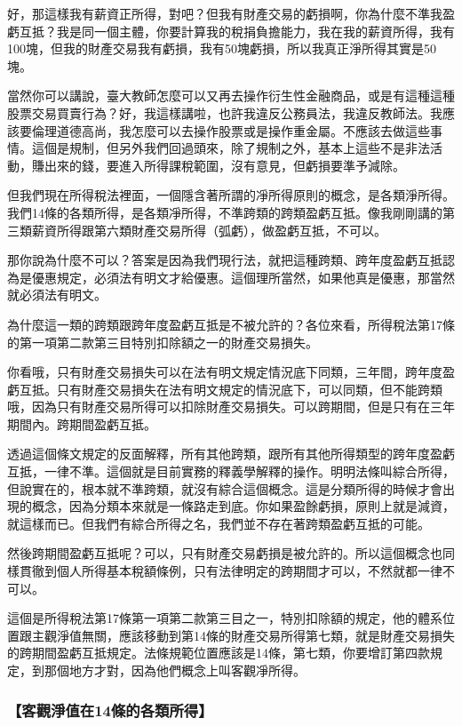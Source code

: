 \documentclass[oneside,sub3section]{ctexbook}
\begin{document}
好，那這樣我有薪資正所得，對吧？但我有財產交易的虧損啊，你為什麼不準我盈虧互抵？我是同一個主體，你要計算我的稅捐負擔能力，我在我的薪資所得，我有100塊，但我的財產交易我有虧損，我有50塊虧損，所以我真正淨所得其實是50塊。

當然你可以講說，臺大教師怎麼可以又再去操作衍生性金融商品，或是有這種這種股票交易買賣行為？好，我這樣講啦，也許我違反公務員法，我違反教師法。我應該要倫理道德高尚，我怎麼可以去操作股票或是操作重金屬。不應該去做這些事情。這個是規制，但另外我們回過頭來，除了規制之外，基本上這些不是非法活動，賺出來的錢，要進入所得課稅範圍，沒有意見，但虧損要準予減除。

但我們現在所得稅法裡面，一個隱含著所謂的凈所得原則的概念，是各類淨所得。我們14條的各類所得，是各類凈所得，不準跨類的跨類盈虧互抵。像我剛剛講的第三類薪資所得跟第六類財產交易所得（弧虧），做盈虧互抵，不可以。

那你說為什麼不可以？答案是因為我們現行法，就把這種跨類、跨年度盈虧互抵認為是優惠規定，必須法有明文才給優惠。這個理所當然，如果他真是優惠，那當然就必須法有明文。

為什麼這一類的跨類跟跨年度盈虧互抵是不被允許的？各位來看，所得稅法第17條的第一項第二款第三目特別扣除額之一的財產交易損失。

你看哦，只有財產交易損失可以在法有明文規定情況底下同類，三年間，跨年度盈虧互抵。只有財產交易損失在法有明文規定的情況底下，可以同類，但不能跨類哦，因為只有財產交易所得可以扣除財產交易損失。可以跨期間，但是只有在三年期間內。跨期間盈虧互抵。

透過這個條文規定的反面解釋，所有其他跨類，跟所有其他所得類型的跨年度盈虧互抵，一律不準。這個就是目前實務的釋義學解釋的操作。明明法條叫綜合所得，但說實在的，根本就不準跨類，就沒有綜合這個概念。這是分類所得的時候才會出現的概念，因為分類本來就是一條路走到底。你如果盈餘虧損，原則上就是減資，就這樣而已。但我們有綜合所得之名，我們並不存在著跨類盈虧互抵的可能。

然後跨期間盈虧互抵呢？可以，只有財產交易虧損是被允許的。所以這個概念也同樣貫徹到個人所得基本稅額條例，只有法律明定的跨期間才可以，不然就都一律不可以。

這個是所得稅法第17條第一項第二款第三目之一，特別扣除額的規定，他的體系位置跟主觀淨值無關，應該移動到第14條的財產交易所得第七類，就是財產交易損失的跨期間盈虧互抵規定。法條規範位置應該是14條，第七類，你要增訂第四款規定，到那個地方才對，因為他們概念上叫客觀凈所得。

\hypertarget{ux5ba2ux89c0ux6de8ux503cux572814ux689dux7684ux5404ux985eux6240ux5f97}{%
\subsubsection{【客觀淨值在14條的各類所得】}\label{ux5ba2ux89c0ux6de8ux503cux572814ux689dux7684ux5404ux985eux6240ux5f97}}
\end{document}
